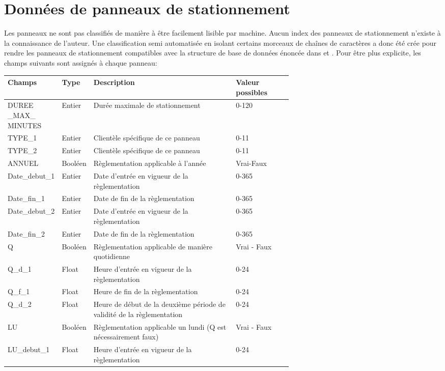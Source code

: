 \section{Données de panneaux de stationnement}
  Les panneaux ne sont pas classifiés de manière à être facilement lisible par machine. Aucun index des panneaux de stationnement n'existe à la connaissance de l'auteur. Une classification semi automatisée en isolant certains morceaux de chaînes de caractères a donc été crée pour rendre les panneaux de stationnement compatibles avec la structure de base de données énoncée dans \textcite{Bourdeau:MethodologieAnalyse:2014} et \textcite{Morency:DeveloppementMise:2022}. Pour être plus explicite, les champs suivants sont assignés à chaque panneau:
  \begin{longtable}{p{0.15 \linewidth}  l p{0.5\linewidth} l  }
    \hline
    Champs & Type & Description & Valeur possibles \\
    \hline
    DUREE \_MAX\_ MINUTES & Entier & Durée maximale de stationnement & 0-120 \\
    TYPE\_1 & Entier & Clientèle spécifique de ce panneau & 0-11\\
    TYPE\_2 & Entier & Clientèle spécifique de ce panneau & 0-11\\
    ANNUEL & Booléen & Règlementation applicable à l'année & Vrai-Faux \\
    Date\_debut\_1 & Entier &  Date d'entrée en vigueur de la règlementation & 0-365\\
    Date\_fin\_1 & Entier & Date de fin de la règlementation & 0-365 \\
    Date\_debut\_2 & Entier & Date d'entrée en vigueur de la règlementation & 0-365 \\
    Date\_fin\_2 & Entier & Date de fin de la règlementation & 0-365 \\
    Q & Booléen & Règlementation applicable de manière quotidienne & Vrai - Faux \\
    Q\_d\_1 & Float & Heure d'entrée en vigueur de la règlementation & 0-24 \\
    Q\_f\_1 & Float & Heure de fin de la règlementation & 0-24\\
    Q\_d\_2 & Float & Heure de début de la deuxième période de validité de la règlementation  & 0-24\\
    LU & Booléen & Règlementation applicable un lundi (Q est nécessairement faux) & Vrai - Faux \\
    LU\_debut\_1 & Float & Heure d'entrée en vigueur de la règlementation & 0-24\\

\end{longtable}

